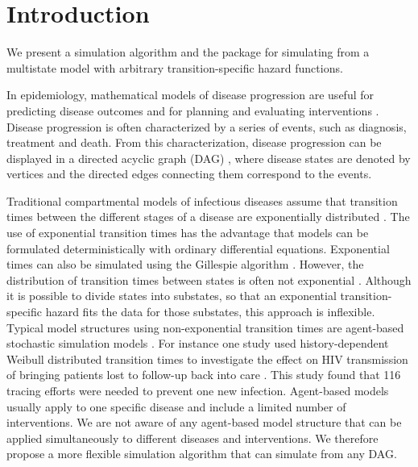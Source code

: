 \section[Introduction]{Introduction}\label{intro}

We present a simulation algorithm and the  package   \citep{pkg:gems} for simulating from a multistate model with arbitrary transition-specific hazard functions.

In epidemiology, mathematical models of disease progression are useful for predicting disease outcomes and for planning and evaluating interventions \citep{Garnett2011}. Disease progression is often characterized by a series of events, such as diagnosis, treatment and death. From this characterization, disease progression can be displayed in a directed acyclic graph (DAG) \citep{Pearl2009}, where disease states are denoted by vertices and the directed edges connecting them correspond to the events.

Traditional compartmental models of infectious diseases assume that transition times between the different stages of a disease are exponentially distributed \citep{Anderson1992}. The use of exponential transition times has the advantage that models can be formulated deterministically with ordinary differential equations. Exponential times can also be simulated using the Gillespie algorithm \citep{Gillespie1977}. However, the distribution of transition times between states is often not exponential \citep{Lloyd2001}. Although it is possible to divide states into substates, so that an exponential transition-specific hazard fits the data for those substates, this approach is inflexible. Typical model structures using non-exponential transition times are agent-based stochastic simulation models \citep{Estill2012, Phillips2011}. For instance one study used history-dependent Weibull distributed transition times to investigate the effect on HIV transmission of bringing patients lost to follow-up back into care \citep{Estill2014}. This study found that 116 tracing efforts were needed to prevent one new infection. Agent-based models usually apply to one specific disease and include a limited number of interventions. We are not aware of any agent-based model structure that can be applied simultaneously to different diseases and interventions. We therefore propose a more flexible simulation algorithm that can simulate from any DAG.

